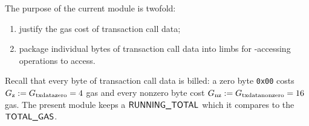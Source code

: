 The purpose of the current module is twofold:
\begin{enumerate}
	\item justify the gas cost of transaction call data;
	\item package individual bytes of transaction call data into limbs for -accessing operations to access.
\end{enumerate}
Recall that every byte of transaction call data is billed: a zero byte \texttt{0x00} costs $G_{\text{z}} := G_{\text{txdatazero}} = 4$ gas and every nonzero byte cost $G_{\text{nz}} := G_{\text{txdatanonzero}} = 16$ gas. The present module keeps a $\textsf{RUNNING\_TOTAL}$ which it compares to the $\textsf{TOTAL\_GAS}$.